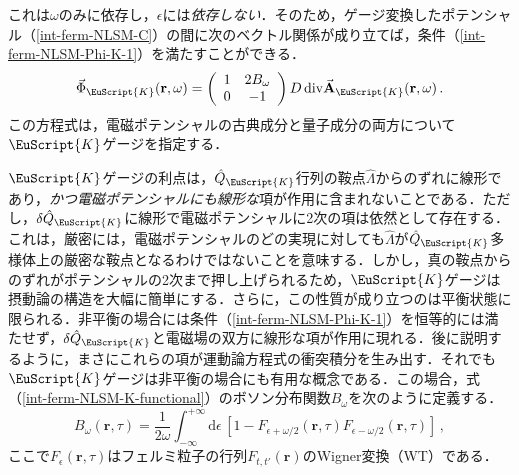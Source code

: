 \documentclass[a4paper,11pt]{ltjsarticle}
\def\d{\mathrm{d}}
\def\Qk{\hat{Q}_{\EuScript{K}}}
\begin{document}
これは$\omega$のみに依存し，$\epsilon$には{\em 依存しない}．そのため，ゲージ変換したポテンシャル（\ref{int-ferm-NLSM-C}）の間に次のベクトル関係が成り立てば，条件（\ref{int-ferm-NLSM-Phi-K-1}）を満たすことができる．
\begin{equation}\label{int-ferm-NLSM-K-functional}
\vec{\Phi}_{\EuScript{K}}(\mathbf{r},\omega)=
\left(\begin{array}{cc} 1& 2B_{\omega} \\ 0 &
-1\end{array}\right)D\,\mathrm{div}
\vec{\mathbf{A}}_{\EuScript{K}}(\mathbf{r},\omega)\, .
\end{equation}
この方程式は，電磁ポテンシャルの古典成分と量子成分の両方について$\EuScript{K}$ゲージを指定する．

$\EuScript{K}$ゲージの利点は，$\Qk$行列の鞍点$\hat \Lambda$からのずれに線形であり，{\em かつ電磁ポテンシャルにも線形な}項が作用に含まれないことである．ただし，$\delta \Qk$に線形で電磁ポテンシャルに2次の項は依然として存在する．これは，厳密には，電磁ポテンシャルのどの実現に対しても$\hat \Lambda$が$\Qk$多様体上の厳密な鞍点となるわけではないことを意味する．しかし，真の鞍点からのずれがポテンシャルの2次まで押し上げられるため，$\EuScript{K}$ゲージは摂動論の構造を大幅に簡単にする．さらに，この性質が成り立つのは平衡状態に限られる．非平衡の場合には条件（\ref{int-ferm-NLSM-Phi-K-1}）を恒等的には満たせず，$\delta\Qk$と電磁場の双方に線形な項が作用に現れる．後に説明するように，まさにこれらの項が運動論方程式の衝突積分を生み出す．それでも$\EuScript{K}$ゲージは非平衡の場合にも有用な概念である．この場合，式（\ref{int-ferm-NLSM-K-functional}）のボソン分布関数$B_{\omega}$を次のように定義する．
\begin{equation}\label{int-ferm-NLSM-bosonic-distribution}
B_{\omega}(\mathbf{r},\tau)=\frac{1}{2\omega}\int^{+\infty}_{-\infty}
\d\epsilon\,\left[1-F_{\epsilon+\omega/2}(\mathbf{r},\tau)
F_{\epsilon-\omega/2}(\mathbf{r},\tau)\right]\,,
\end{equation}
ここで$F_{\epsilon}(\mathbf{r},\tau)$はフェルミ粒子の行列$F_{t,t'}(\mathbf{r})$のWigner変換（WT）である．
\end{document}
